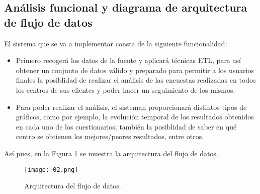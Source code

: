 \medskip
\subsection{Análisis funcional y diagrama de arquitectura de flujo de datos}
\label{02}
El sistema que se va a implementar consta de la siguiente funcionalidad:
\begin{itemize}
 \item Primero recogerá los datos de la fuente y aplicará técnicas ETL, para así obtener un conjunto de datos válido y preparado para permitir a los usuarios finales la posiblidad de realizar el análisis de las encuestas realizadas en todos los centros de sus clientes y poder hacer un seguimiento de los mismos.
 \item Para poder realizar el análisis, el sisteman proporcionará distintos tipos de gráficos, como por ejemplo, la evolución temporal de los resultados obtenidos en cada uno de los cuestionarios; también la posiblidad de saber en qué centro se obtienen los mejores/peores resultados, entre otros.
\end{itemize}

Así pues, en la Figura \ref{02-image} se muestra la arquitectura del flujo de datos. 
\begin{figure}[!th]
\texttt{[image: 02.png]}
\centering
\caption{Arquitectura del flujo de datos.}
\label{02-image}
\end{figure}
